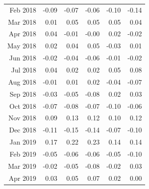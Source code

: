 \begin{tabularx}{\textwidth}{rrrrrr}
  Feb 2018 & -0.09 & -0.07 & -0.06 & -0.10 & -0.14 \\ 
  Mar 2018 & 0.01 & 0.05 & 0.05 & 0.05 & 0.04 \\ 
  Apr 2018 & 0.04 & -0.01 & -0.00 & 0.02 & -0.02 \\ 
  May 2018 & 0.02 & 0.04 & 0.05 & -0.03 & 0.01 \\ 
  Jun 2018 & -0.02 & -0.04 & -0.06 & -0.01 & -0.02 \\ 
  Jul 2018 & 0.04 & 0.02 & 0.02 & 0.05 & 0.08 \\ 
  Aug 2018 & -0.01 & 0.01 & 0.02 & -0.04 & -0.07 \\ 
  Sep 2018 & -0.03 & -0.05 & -0.08 & 0.02 & 0.03 \\ 
  Oct 2018 & -0.07 & -0.08 & -0.07 & -0.10 & -0.06 \\ 
  Nov 2018 & 0.09 & 0.13 & 0.12 & 0.10 & 0.12 \\ 
  Dec 2018 & -0.11 & -0.15 & -0.14 & -0.07 & -0.10 \\ 
  Jan 2019 & 0.17 & 0.22 & 0.23 & 0.14 & 0.14 \\ 
  Feb 2019 & -0.05 & -0.06 & -0.06 & -0.05 & -0.10 \\ 
  Mar 2019 & -0.02 & -0.05 & -0.08 & -0.02 & 0.03 \\ 
  Apr 2019 & 0.03 & 0.05 & 0.07 & 0.02 & 0.00 \\ 
   \hline
\end{tabularx}
